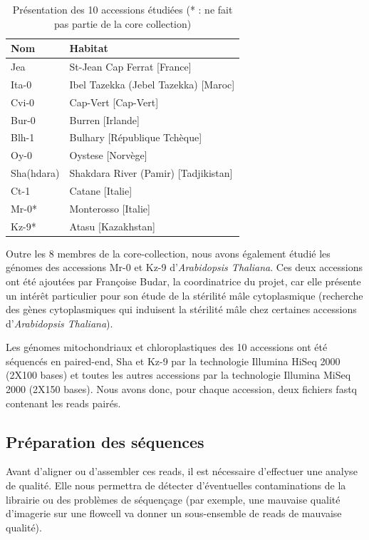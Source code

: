 \documentclass[a4paper]{article}
\begin{document}
\begin{table}[H]
\centering
\begin{tabular}{|l|l|}
\hline
   Nom & Habitat \\
   \hline
   Jea & St-Jean Cap Ferrat [France] \\
   Ita-0 & Ibel Tazekka (Jebel Tazekka) [Maroc] \\
   Cvi-0 & Cap-Vert [Cap-Vert] \\
   Bur-0 & Burren [Irlande] \\
   Blh-1 & Bulhary [République Tchèque] \\
   Oy-0 & Oystese [Norvège] \\
   Sha(hdara) & Shakdara River (Pamir) [Tadjikistan] \\
   Ct-1 & Catane [Italie] \\
   Mr-0* & Monterosso [Italie] \\
   Kz-9* & Atasu [Kazakhstan] \\
   \hline
\end{tabular}
\label{donnees}
\caption{Présentation des 10 accessions étudiées (* : ne fait pas partie de la core collection)}
\end{table}

Outre les 8 membres de la core-collection, nous avons également étudié les génomes des accessions Mr-0 et Kz-9 d'\textit{Arabidopsis Thaliana}. Ces deux accessions ont été ajoutées par Françoise Budar, la coordinatrice du projet, car elle présente un intérêt particulier pour son étude de la stérilité mâle cytoplasmique (recherche des gènes cytoplasmiques qui induisent la stérilité mâle chez certaines accessions d'\textit{Arabidopsis Thaliana}). 

Les génomes mitochondriaux et chloroplastiques des 10 accessions ont été séquencés en paired-end, Sha et Kz-9 par la technologie Illumina HiSeq 2000 (2X100 bases) et toutes les autres accessions par la technologie Illumina MiSeq 2000 (2X150 bases). Nous avons donc, pour chaque accession, deux fichiers fastq contenant les reads pairés. 

\subsection{Préparation des séquences}

Avant d'aligner ou d'assembler ces reads, il est nécessaire d'effectuer une analyse de qualité. Elle nous permettra de détecter d'éventuelles contaminations de la librairie ou des problèmes de séquençage (par exemple, une mauvaise qualité d'imagerie sur une flowcell va donner un sous-ensemble de reads de mauvaise qualité).
\end{document}
